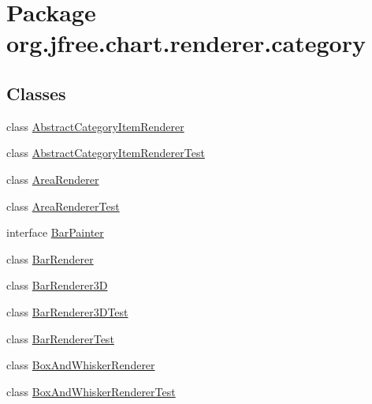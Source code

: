 \hypertarget{namespaceorg_1_1jfree_1_1chart_1_1renderer_1_1category}{}\section{Package org.\+jfree.\+chart.\+renderer.\+category}
\label{namespaceorg_1_1jfree_1_1chart_1_1renderer_1_1category}
\subsection*{Classes}
\begin{DoxyCompactItemize}
\item 
class \mbox{\hyperlink{classorg_1_1jfree_1_1chart_1_1renderer_1_1category_1_1_abstract_category_item_renderer}{Abstract\+Category\+Item\+Renderer}}
\item 
class \mbox{\hyperlink{classorg_1_1jfree_1_1chart_1_1renderer_1_1category_1_1_abstract_category_item_renderer_test}{Abstract\+Category\+Item\+Renderer\+Test}}
\item 
class \mbox{\hyperlink{classorg_1_1jfree_1_1chart_1_1renderer_1_1category_1_1_area_renderer}{Area\+Renderer}}
\item 
class \mbox{\hyperlink{classorg_1_1jfree_1_1chart_1_1renderer_1_1category_1_1_area_renderer_test}{Area\+Renderer\+Test}}
\item 
interface \mbox{\hyperlink{interfaceorg_1_1jfree_1_1chart_1_1renderer_1_1category_1_1_bar_painter}{Bar\+Painter}}
\item 
class \mbox{\hyperlink{classorg_1_1jfree_1_1chart_1_1renderer_1_1category_1_1_bar_renderer}{Bar\+Renderer}}
\item 
class \mbox{\hyperlink{classorg_1_1jfree_1_1chart_1_1renderer_1_1category_1_1_bar_renderer3_d}{Bar\+Renderer3D}}
\item 
class \mbox{\hyperlink{classorg_1_1jfree_1_1chart_1_1renderer_1_1category_1_1_bar_renderer3_d_test}{Bar\+Renderer3\+D\+Test}}
\item 
class \mbox{\hyperlink{classorg_1_1jfree_1_1chart_1_1renderer_1_1category_1_1_bar_renderer_test}{Bar\+Renderer\+Test}}
\item 
class \mbox{\hyperlink{classorg_1_1jfree_1_1chart_1_1renderer_1_1category_1_1_box_and_whisker_renderer}{Box\+And\+Whisker\+Renderer}}
\item 
class \mbox{\hyperlink{classorg_1_1jfree_1_1chart_1_1renderer_1_1category_1_1_box_and_whisker_renderer_test}{Box\+And\+Whisker\+Renderer\+Test}}

\end{DoxyCompactItemize}
